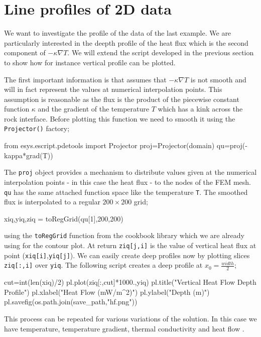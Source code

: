 \section{Line profiles of 2D data}

We want to investigate the profile of the data of the last example. 
We are particularly interested in the deepth profile of the heat flux which is
the second component of $-\kappa \nabla T$. We will extend the script developed in the 
previous section to show how for instance vertical profile can be plotted.

The first important information is that \esc assumes that $-\kappa \nabla T$ is not smooth and
will in fact represent the values at numerical interpolation points. This assumption is reasonable as
the flux is the product of the piecewise constant function $\kappa$ and 
the gradient of the temperature $T$ which has a kink across the rock interface. 
Before plotting this function we need to smooth it using the 
\verb|Projector()| factory;
\begin{python}
from esys.escript.pdetools import Projector
proj=Projector(domain)
qu=proj(-kappa*grad(T))
\end{python}
The \verb|proj| object provides a mechanism to distribute values given at the numerical interpolation points
- in this case the heat flux - to the nodes of the FEM mesh. \verb|qu| has the same attached function space
like the temperature \verb|T|. The smoothed flux is interpolated 
to a regular $200\times 200$ grid;
\begin{python}
xiq,yiq,ziq = toRegGrid(qu[1],200,200)
\end{python}
using the \verb|toRegGrid| function from the cookbook library which we are already using for the contour plot.
At return \verb|ziq[j,i]| is the value of vertical heat flux at point 
(\verb|xiq[i]|,\verb|yiq[j]|). We can easily create deep profiles now by
plotting slices \verb|ziq[:,i]| over \verb|yiq|. The following script
creates a deep profile at $x_{0}=\frac{width}{2}$;
\begin{python}
cut=int(len(xiq)/2)
pl.plot(ziq[:,cut]*1000.,yiq)
pl.title("Vertical Heat Flow Depth Profile")
pl.xlabel("Heat Flow (mW/m^2)")
pl.ylabel("Depth (m)")
pl.savefig(os.path.join(save_path,"hf.png"))
\end{python}
This process can be repeated for various variations of the solution. In this case we have temperature, temperature gradient, thermal conductivity and heat flow .

